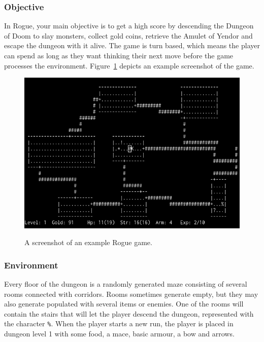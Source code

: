 \documentclass[12pt,a4paper]{article}
\begin{document}
    \subsubsection{Objective}\label{subsubsec:objective}
    In Rogue, your main objective is to get a high score by descending the Dungeon of Doom to slay monsters, collect gold coins, retrieve the Amulet of Yendor and escape the dungeon with it alive.
    The game is turn based, which means the player can spend as long as they want thinking their next move before the game processes the environment.
    Figure~\ref{fig:rogsc} depicts an example screenshot of the game.

    \begin{figure}[t]
        \caption{A screenshot of an example Rogue game.}
        \centering
        \includegraphics[scale=0.5]{rogue_screenshot}
        \label{fig:rogsc}
    \end{figure}

    \subsubsection{Environment}\label{subsubsec:environment}

    Every floor of the dungeon is a randomly generated maze consisting of several rooms connected with corridors.
    Rooms sometimes generate empty, but they may also generate populated with several items or enemies.
    One of the rooms will contain the stairs that will let the player descend the dungeon, represented with the character \texttt{\%}.
    When the player starts a new run, the player is placed in dungeon level 1 with some food, a mace, basic armour, a bow and arrows.
\end{document}
